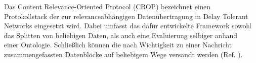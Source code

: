 Das Content Relevance-Oriented Protocol (CROP) bezeichnet einen Protokollstack
der zur relevanceabh{\"a}ngigen Daten{\"u}bertragung in Delay Tolerant Networks
eingesetzt wird. Dabei umfasst das daf{\"u}r entwickelte Framework sowohl das
Splitten von beliebigen Daten, als auch eine Evaluierung selbiger anhand einer
Ontologie. Schlie{\ss}lich k{\"o}nnen die nach Wichtigkeit zu einer Nachricht
zusammengefassten Datenbl{\"o}cke auf beliebigem Wege versandt werden (Ref.
\cite{Daher}).
